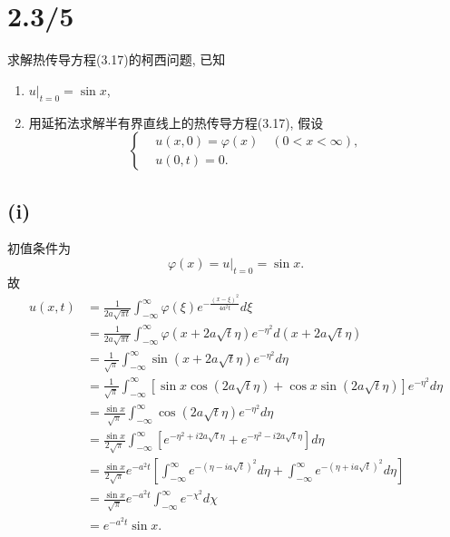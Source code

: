 \documentclass[11pt,a4paper]{article}
\author{刘逸灏 (515370910207)}
\begin{document}
\maketitle

\section{2.3/5}
\begin{problem}
求解热传导方程(3.17)的柯西问题, 已知
\begin{enumerate}
  \item $u|_{t=0}=\sin x$,
  \item 用延拓法求解半有界直线上的热传导方程(3.17), 假设
        $$\left\{\begin{aligned}
             & u(x,0)=\varphi(x)\quad(0<x<\infty), \\
             & u(0,t)=0.
          \end{aligned}\right.$$
\end{enumerate}
\end{problem}

\subsection*{(i)}
初值条件为
$$\varphi(x)=u|_{t=0}=\sin x.$$
故
\begin{align*}
  u(x,t)
   & =\frac{1}{2a\sqrt{\pi t}}\int_{-\infty}^\infty\varphi(\xi)e^{-\frac{(x-\xi)^2}{4a^2t}}d\xi                                                               \\
   & =\frac{1}{2a\sqrt{\pi t}}\int_{-\infty}^\infty\varphi(x+2a\sqrt{t}\eta)e^{-\eta^2}d(x+2a\sqrt{t}\eta)                                                    \\
   & =\frac{1}{\sqrt{\pi}}\int_{-\infty}^\infty\sin(x+2a\sqrt{t}\eta)e^{-\eta^2}d\eta                                                                         \\
   & =\frac{1}{\sqrt{\pi}}\int_{-\infty}^\infty\left[\sin x\cos(2a\sqrt{t}\eta)+\cos x\sin(2a\sqrt{t}\eta)\right]e^{-\eta^2}d\eta                             \\
   & =\frac{\sin x}{\sqrt{\pi}}\int_{-\infty}^\infty\cos(2a\sqrt{t}\eta)e^{-\eta^2}d\eta                                                                      \\
   & =\frac{\sin x}{2\sqrt{\pi}}\int_{-\infty}^\infty \left[e^{-\eta^2+i2a\sqrt{t}\eta}+e^{-\eta^2-i2a\sqrt{t}\eta}\right]d\eta                               \\
   & =\frac{\sin x}{2\sqrt{\pi}}e^{-a^2t}\left[\int_{-\infty}^\infty e^{-(\eta-ia\sqrt{t})^2}d\eta+\int_{-\infty}^\infty e^{-(\eta+ia\sqrt{t})^2}d\eta\right] \\
   & =\frac{\sin x}{\sqrt{\pi}}e^{-a^2t}\int_{-\infty}^\infty e^{-\chi^2}d\chi                                                                                \\
   & =e^{-a^2t}\sin x.
\end{align*}
\end{document}
